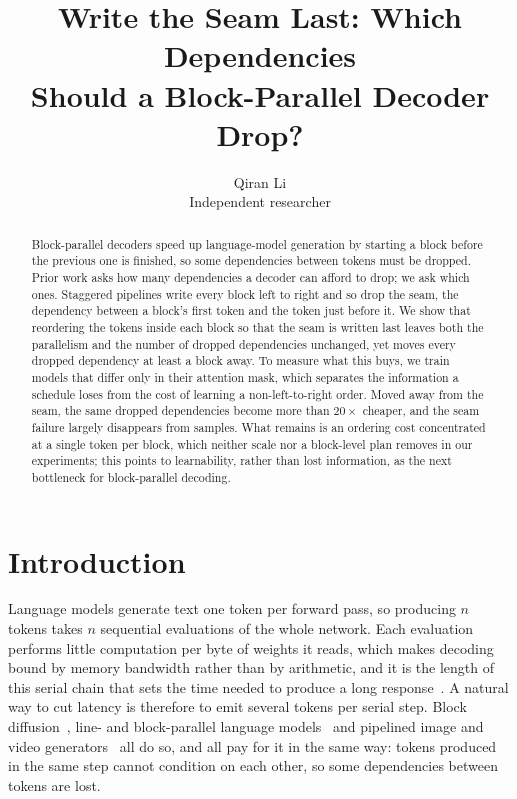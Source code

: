 \documentclass{article}
\title{Write the Seam Last: Which Dependencies\\Should a Block-Parallel Decoder Drop?}
\author{Qiran Li \\ Independent researcher}
\theoremstyle{definition}
\theoremstyle{remark}
\begin{document}
\maketitle
{}

\begin{abstract}
Block-parallel decoders speed up language-model generation by starting a block before the previous one is finished, so some dependencies between tokens must be dropped.
Prior work asks how many dependencies a decoder can afford to drop; we ask which ones.
Staggered pipelines write every block left to right and so drop the seam, the dependency between a block's first token and the token just before it.
We show that reordering the tokens inside each block so that the seam is written last leaves both the parallelism and the number of dropped dependencies unchanged, yet moves every dropped dependency at least a block away.
To measure what this buys, we train models that differ only in their attention mask, which separates the information a schedule loses from the cost of learning a non-left-to-right order.
Moved away from the seam, the same dropped dependencies become more than $20\times$ cheaper, and the seam failure largely disappears from samples.
What remains is an ordering cost concentrated at a single token per block, which neither scale nor a block-level plan removes in our experiments; this points to learnability, rather than lost information, as the next bottleneck for block-parallel decoding.
\end{abstract}

\section{Introduction}
\label{sec:intro}

Language models generate text one token per forward pass, so producing $n$ tokens takes $n$ sequential evaluations of the whole network.
Each evaluation performs little computation per byte of weights it reads, which makes decoding bound by memory bandwidth rather than by arithmetic, and it is the length of this serial chain that sets the time needed to produce a long response~\citep{leviathan2023speculative,chen2023speculative}.
A natural way to cut latency is therefore to emit several tokens per serial step.
Block diffusion~\citep{arriola2025block}, line- and block-parallel language models~\citep{li2026lclm,zhang2026latlm,he2026psf} and pipelined image and video generators~\citep{he2025zipar,ye2025diagonal} all do so, and all pay for it in the same way: tokens produced in the same step cannot condition on each other, so some dependencies between tokens are lost.
\end{document}
